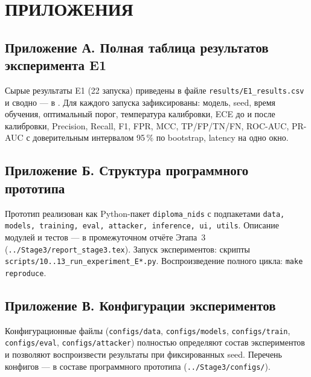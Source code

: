 \documentclass[14pt, a4paper]{extarticle}
\begin{document}
\appendix
\section*{ПРИЛОЖЕНИЯ}

\subsection*{Приложение А. Полная таблица результатов эксперимента E1}

Сырые результаты E1 (22 запуска) приведены в файле
\verb|results/E1_results.csv| и сводно --- в .
Для каждого запуска зафиксированы: модель, seed, время обучения,
оптимальный порог, температура калибровки, ECE до и после калибровки,
Precision, Recall, F1, FPR, MCC, TP/FP/TN/FN, ROC-AUC, PR-AUC с
доверительным интервалом 95\,\% по bootstrap, latency на одно окно.

\subsection*{Приложение Б. Структура программного прототипа}

Прототип реализован как Python-пакет \texttt{diploma\_nids} с
подпакетами \texttt{data, models, training, eval, attacker, inference,
ui, utils}. Описание модулей и тестов --- в промежуточном отчёте
Этапа~3 (\verb|../Stage3/report_stage3.tex|). Запуск экспериментов:
скрипты \verb|scripts/10..13_run_experiment_E*.py|. Воспроизведение
полного цикла: \verb|make reproduce|.

\subsection*{Приложение В. Конфигурации экспериментов}

Конфигурационные файлы (\texttt{configs/data}, \texttt{configs/models},
\texttt{configs/train}, \texttt{configs/eval}, \texttt{configs/attacker})
полностью определяют состав экспериментов и позволяют воспроизвести
результаты при фиксированных seed. Перечень конфигов --- в составе
программного прототипа (\verb|../Stage3/configs/|).
\end{document}
